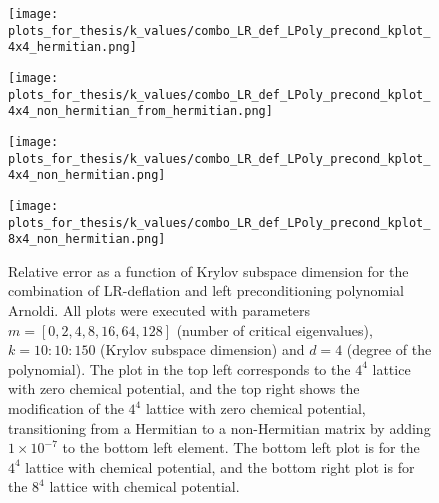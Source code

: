 \begin{figure}[H]
    \centering
    \begin{minipage}{0.45\textwidth}
        \centering
        \texttt{[image: plots\_for\_thesis/k\_values/combo\_LR\_def\_LPoly\_precond\_kplot\_4x4\_hermitian.png]} %
    \end{minipage}%
    \hspace{0.02\textwidth} %
    \begin{minipage}{0.45\textwidth}
        \centering
        \texttt{[image: plots\_for\_thesis/k\_values/combo\_LR\_def\_LPoly\_precond\_kplot\_4x4\_non\_hermitian\_from\_hermitian.png]} %
    \end{minipage}
    
    \vspace{0.02\textwidth} %
    
    \begin{minipage}{0.45\textwidth}
        \centering
        \texttt{[image: plots\_for\_thesis/k\_values/combo\_LR\_def\_LPoly\_precond\_kplot\_4x4\_non\_hermitian.png]} %
    \end{minipage}%
    \hspace{0.02\textwidth} %
    \begin{minipage}{0.45\textwidth}
        \centering
        \texttt{[image: plots\_for\_thesis/k\_values/combo\_LR\_def\_LPoly\_precond\_kplot\_8x4\_non\_hermitian.png]} %
    \end{minipage}
    
    \caption{\small Relative error as a function of Krylov subspace dimension for the combination of LR-deflation and left preconditioning polynomial Arnoldi. All plots were executed with parameters $m = [0, 2, 4, 8, 16, 64, 128]$ (number of critical eigenvalues), $k = 10:10:150$ (Krylov subspace dimension) and $d = 4$ (degree of the polynomial). The plot in the top left corresponds to the $4^4$ lattice with zero chemical potential, and the top right shows the modification of the $4^4$ lattice with zero chemical potential, transitioning from a Hermitian to a non-Hermitian matrix by adding $1 \times 10^{-7}$ to the bottom left element. The bottom left plot is for the $4^4$ lattice with chemical potential, and the bottom right plot is for the $8^4$ lattice with chemical potential.}
    \label{fig:combo_LR+left_pre_cond_k_plot}
\end{figure}

